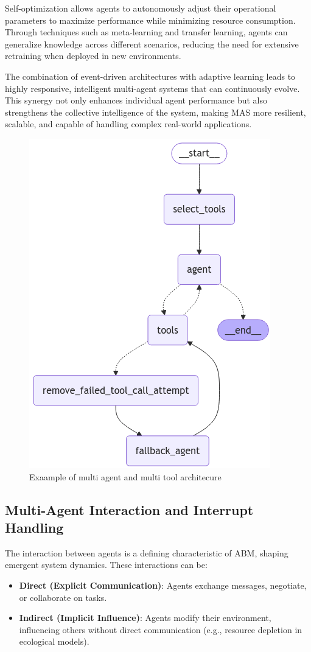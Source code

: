 Self-optimization allows agents to autonomously adjust their operational parameters to maximize performance while minimizing resource consumption. Through techniques such as meta-learning and transfer learning, agents can generalize knowledge across different scenarios, reducing the need for extensive retraining when deployed in new environments.

The combination of event-driven architectures with adaptive learning leads to highly responsive, intelligent multi-agent systems that can continuously evolve. This synergy not only enhances individual agent performance but also strengthens the collective intelligence of the system, making MAS more resilient, scalable, and capable of handling complex real-world applications.

\begin{figure}[h!]
    \centering
    \includegraphics[width=0.5\linewidth]{Assets/complex_agent.png}
    \caption{Exaample of multi agent and multi tool architecure}
    \label{fig:enter-label}
\end{figure}
\subsection{Multi-Agent Interaction and Interrupt Handling}

The interaction between agents is a defining characteristic of ABM, shaping emergent system dynamics. These interactions can be: \begin{itemize} \item \textbf{Direct (Explicit Communication)}: Agents exchange messages, negotiate, or collaborate on tasks. \item \textbf{Indirect (Implicit Influence)}: Agents modify their environment, influencing others without direct communication (e.g., resource depletion in ecological models). \end{itemize}

